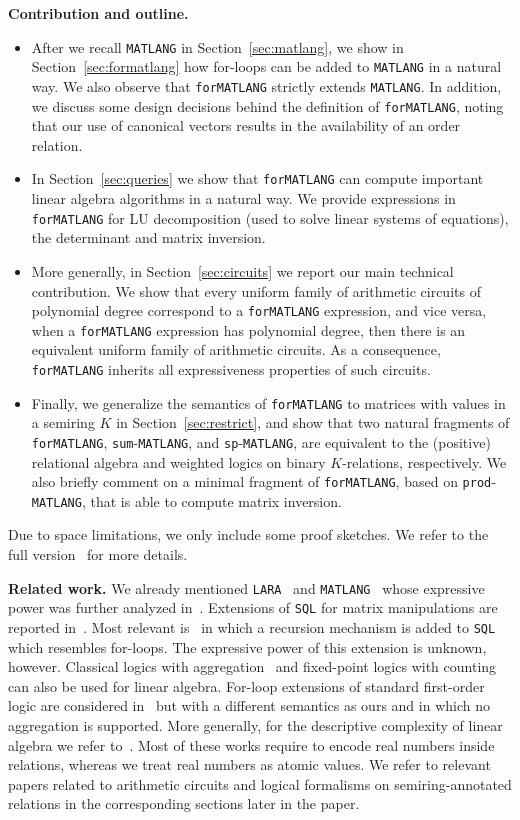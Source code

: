 \documentclass[sigconf]{acmart}
\newcommand{\lara}{\texttt{LARA}\xspace}
\newcommand{\lang}{\texttt{MATLANG}\xspace}
\newcommand{\langfor}{\texttt{for}\text{-}\texttt{MATLANG}\xspace}
\newcommand{\langsum}{\texttt{sum}-\texttt{MATLANG}\xspace}
\newcommand{\langprod}{\texttt{sp}-\texttt{MATLANG}\xspace}
\newcommand{\langmprod}{\texttt{prod}-\texttt{MATLANG}\xspace}
\begin{document}
\smallskip
\noindent
\textbf{Contribution and outline.} 
\begin{itemize}
	\item After we recall \lang in Section~\ref{sec:matlang}, we show in Section~\ref{sec:formatlang}
	how for-loops can be added to \lang in a natural way. We also observe that
	\langfor strictly extends \lang. In addition, we discuss some design decisions behind the definition of \langfor, noting that our use of canonical vectors results in the availability of an order relation.
	
	\item In Section~\ref{sec:queries} we show that \langfor can compute important linear algebra algorithms in a natural way. We provide expressions in \langfor for LU decomposition (used to solve linear systems of equations), the determinant and matrix inversion.
	\item More generally, in Section~\ref{sec:circuits} we report our main technical contribution.
	 We show that every uniform family of arithmetic circuits of polynomial degree correspond to a \langfor expression, and vice versa, when a \langfor expression has polynomial degree, then there is an equivalent uniform family of arithmetic circuits. As a consequence, \langfor inherits all expressiveness properties of such circuits.
	\item  Finally,  we generalize the semantics of \langfor to matrices with values in a semiring $K$  in Section~\ref{sec:restrict}, and show that two natural fragments of \langfor, \langsum, and \langprod, are equivalent to the (positive) relational algebra and weighted logics on binary $K$-relations, respectively. We also briefly comment on a minimal fragment of \langfor, based on \langmprod, that is able to compute matrix inversion.
\end{itemize}
Due to space limitations, we only include some proof sketches. We refer
to the full version~\cite{geerts2020expressive} for more details.

\smallskip
\noindent
\textbf{Related work.} 
We already mentioned \lara~\cite{HutchisonHS17} and \lang~\cite{matlang-journal}
whose expressive power was further analyzed in~\cite{BarceloH0S20,brijder2019matrices,Geerts19,Geerts20}.
Extensions of \texttt{SQL} for matrix manipulations are reported in~\cite{Jermaine/17/LAonRA}. Most relevant
is~\cite{JankovLYCZJG19} in which a recursion mechanism is added to \texttt{SQL} which resembles for-loops.
The expressive power of this extension is unknown, however. Classical logics with aggregation~\cite{Hella:2001} and fixed-point logics with counting~\cite{GroheP17} can also be used for linear algebra. For-loop extensions of  standard first-order logic are considered in~\cite{NevenOTB01} but with a different semantics as ours and in which no aggregation is supported.
More generally, for the descriptive complexity of linear algebra we refer to~\cite{dghl_rank,holm_phd}. Most of these works require to encode real numbers inside relations, whereas we treat real numbers as atomic values. We refer to relevant papers related to arithmetic circuits and logical formalisms on semiring-annotated relations in the corresponding sections later in the paper.
\end{document}
